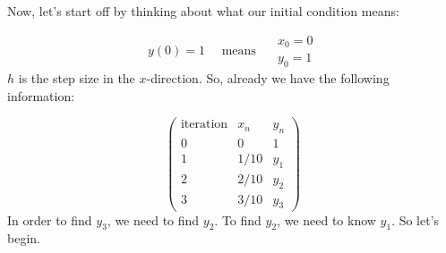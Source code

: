 \documentclass[a4paper,12pt]{article} %
\begin{document}
 Now, let's start off by thinking about what our initial condition means:
 
 $$ y(0)=1\quad \text{ means }\quad \begin{matrix}x_0 = 0 \\ y_0 = 1 \end{matrix}$$
 $h$ is the step size in the $x$-direction. So, already we have the following information:
 
$$ 
\left(\begin{matrix}
 	\text{iteration} & x_n & y_n \\
 	0 & 0 & 1 \\
 	1 & 1/10 & y_1 \\
 	2 & 2/10 & y_2 \\
 	3 & 3/10 & y_3
\end{matrix}\right)
 $$
 In order to find $y_3$, we need to find $y_2$. To find $y_2$, we need to know $y_1$. So let's begin.
 
\end{document}
